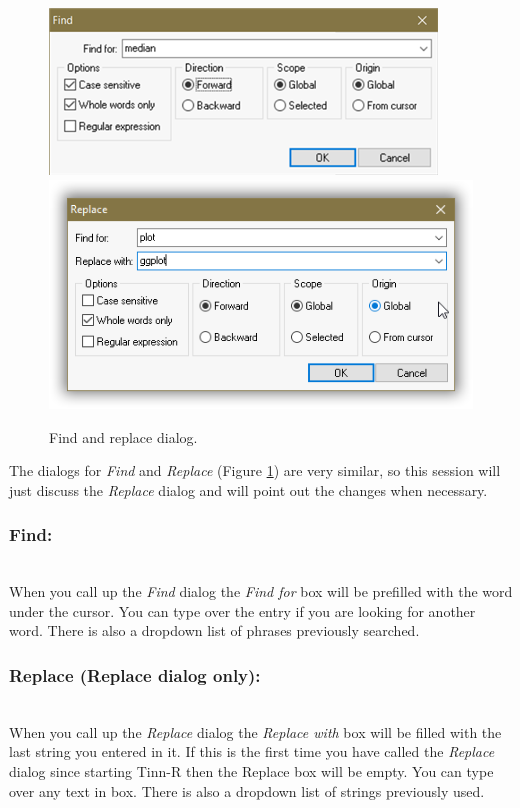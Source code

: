 \begin{figure}[H]
  \includegraphics[scale=0.35]{./res/dlg_find.png}~~
  \includegraphics[scale=0.35]{./res/dlg_replace.png}\\
  \caption{Find and replace dialog.}
  \label{fig:dlg_find_replace}
\end{figure}

The dialogs for \textit{Find}
and \textit{Replace}
(Figure \ref{fig:dlg_find_replace})
are very similar, so this session will just discuss the \textit{Replace} dialog
and will point out the changes when necessary.


\subsubsection{Find:}\\
When you call up the \textit{Find} dialog
the \textit{Find for} box will be
prefilled with the word under the cursor. You can type over the entry if you
are looking for another word. There is also a dropdown list of phrases
previously searched.


\subsubsection{Replace (Replace dialog only):} \\
When you call up the \textit{Replace} dialog
the \textit{Replace with} box
will be filled with the last string you entered in it. If this is the first
time you have called the \textit{Replace} dialog since starting Tinn-R then
the Replace box will be empty. You can type over any text in box. There is
also a dropdown list of strings previously used.

